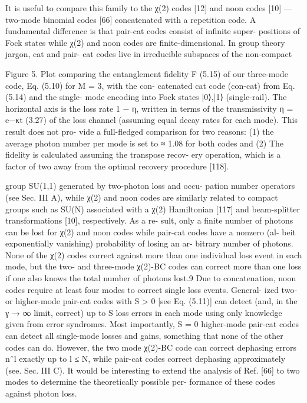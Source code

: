 \documentclass[12]{amsart}
\newcommand\0{\mathbf{0}}
\newcommand\<{\langle}
\renewcommand\>{\rangle}
\begin{document}
It is useful to compare this family to the χ(2) codes [12] and noon codes [10] — two-mode binomial codes [66] concatenated with a repetition code. A fundamental difference is that pair-cat codes consist of infinite super- positions of Fock states while χ(2) and noon codes are finite-dimensional. In group theory jargon, cat and pair- cat codes live in irreducible subspaces of the non-compact

Figure 5. Plot comparing the entanglement fidelity F (5.15) of our three-mode code, Eq. (5.10) for M = 3, with the con- catenated cat code (con-cat) from Eq. (5.14) and the single- mode encoding into Fock states {|0⟩,|1⟩} (single-rail). The horizontal axis is the loss rate 1 − η, written in terms of the transmissivity η = e−κt (3.27) of the loss channel (assuming equal decay rates for each mode). This result does not pro- vide a full-fledged comparison for two reasons: (1) the average photon number per mode is set to ≈ 1.08 for both codes and (2) The fidelity is calculated assuming the transpose recov- ery operation, which is a factor of two away from the optimal recovery procedure [118].

group SU(1,1) generated by two-photon loss and occu- pation number operators (see Sec. III A), while χ(2) and noon codes are similarly related to compact groups such as SU(N) associated with a χ(2) Hamiltonian [117] and beam-splitter transformations [10], respectively. As a re- sult, only a finite number of photons can be lost for χ(2) and noon codes while pair-cat codes have a nonzero (al- beit exponentially vanishing) probability of losing an ar- bitrary number of photons. None of the χ(2) codes correct against more than one individual loss event in each mode, but the two- and three-mode χ(2)-BC codes can correct more than one loss if one also knows the total number of photons lost.9 Due to concatenation, noon codes require at least four modes to correct single loss events. General- ized two- or higher-mode pair-cat codes with S > 0 [see Eq. (5.11)] can detect (and, in the γ → ∞ limit, correct) up to S loss errors in each mode using only knowledge given from error syndromes. Most importantly, S = 0 higher-mode pair-cat codes can detect all single-mode losses and gains, something that none of the other codes can do. However, the two mode χ(2)-BC code can correct dephasing errors nˆl exactly up to l ≤ N, while pair-cat codes correct dephasing approximately (see. Sec. III C). It would be interesting to extend the analysis of Ref. [66] to two modes to determine the theoretically possible per- formance of these codes against photon loss.
\end{document}
